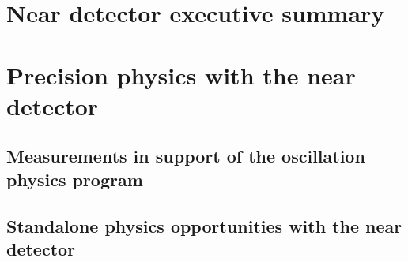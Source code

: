 \chapter{Near detector executive summary}
\label{ch:nd-execsum}



\chapter{Precision physics with the near detector}
\label{ch:prec-nd}


\section{Measurements in support of the oscillation physics program}
\label{sec:prec-nd-support}


\section{Standalone physics opportunities with the near detector}
\label{sec:prec-nd-standalone}